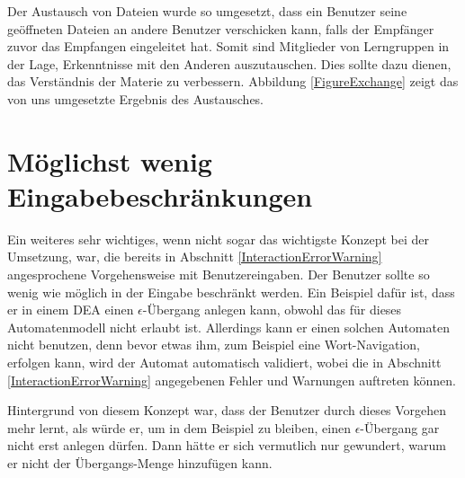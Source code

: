 Der Austausch von Dateien wurde so umgesetzt, dass ein Benutzer seine geöffneten
Dateien an andere Benutzer verschicken kann, falls der Empfänger zuvor das
Empfangen eingeleitet hat. Somit sind Mitglieder von Lerngruppen in der Lage,
Erkenntnisse mit den Anderen auszutauschen. Dies sollte dazu dienen, das
Verständnis der Materie zu verbessern. Abbildung \ref{FigureExchange} zeigt das
von uns umgesetzte Ergebnis des Austausches.\vspace{10pt}


\section{Möglichst wenig Eingabebeschränkungen}\label{ConceptsInput}

Ein weiteres sehr wichtiges, wenn nicht sogar das wichtigste Konzept bei der
Umsetzung, war, die bereits in Abschnitt \ref{InteractionErrorWarning}
angesprochene Vorgehensweise mit Benutzereingaben. Der Benutzer sollte so wenig wie möglich in
der Eingabe beschränkt werden. Ein Beispiel dafür ist, dass er in einem DEA einen
$\epsilon$-Übergang anlegen kann, obwohl das für dieses Automatenmodell nicht
erlaubt ist. Allerdings kann er einen solchen Automaten nicht benutzen, denn bevor etwas
ihm, zum Beispiel eine Wort-Navigation, erfolgen kann, wird der Automat
automatisch validiert, wobei die in Abschnitt \ref{InteractionErrorWarning}
angegebenen Fehler und Warnungen auftreten können.\vspace{10pt}

Hintergrund von diesem Konzept war, dass der Benutzer durch dieses Vorgehen mehr
lernt, als würde er, um in dem Beispiel zu bleiben, einen $\epsilon$-Übergang
gar nicht erst anlegen dürfen. Dann hätte er sich vermutlich nur gewundert,
warum er \Symbol{$\epsilon$} nicht der Übergangs-Menge hinzufügen
kann.\vspace{10pt}
